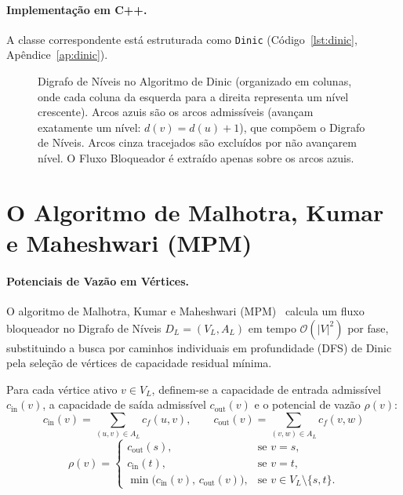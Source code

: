 \paragraph{Implementação em C++.}
A classe correspondente está estruturada como \lstinline{Dinic} (Código~\ref{lst:dinic}, Apêndice~\ref{ap:dinic}).

\begin{figure}[!ht]
\centering

\caption{Digrafo de Níveis no Algoritmo de Dinic (organizado em colunas, onde cada coluna da esquerda para a direita representa um nível crescente). Arcos azuis são os arcos admissíveis (avançam exatamente um nível: $d(v) = d(u)+1$), que compõem o Digrafo de Níveis. Arcos cinza tracejados são excluídos por não avançarem nível. O Fluxo Bloqueador é extraído apenas sobre os arcos azuis.}
\label{fig:grafo_niveis}
\end{figure}


\section{O Algoritmo de Malhotra, Kumar e Maheshwari (MPM)}\label{sec:mpm}

\paragraph{Potenciais de Vazão em Vértices.}
O algoritmo de Malhotra, Kumar e Maheshwari (MPM)~\cite{malhotra1978algorithm} calcula um fluxo bloqueador no Digrafo de Níveis $D_L = (V_L, A_L)$ em tempo $\mathcal{O}(|V|^2)$ por fase, substituindo a busca por caminhos individuais em profundidade (DFS) de Dinic pela seleção de vértices de capacidade residual mínima.

Para cada vértice ativo $v \in V_L$, definem-se a capacidade de entrada admissível $c_{\text{in}}(v)$, a capacidade de saída admissível $c_{\text{out}}(v)$ e o potencial de vazão $\rho(v)$:
\begin{equation}
    c_{\text{in}}(v) = \sum_{(u,v) \in A_L} c_f(u,v), \qquad
    c_{\text{out}}(v) = \sum_{(v,w) \in A_L} c_f(v,w)
\end{equation}
\begin{equation}
    \rho(v) = \begin{cases}
        c_{\text{out}}(s), & \text{se } v = s, \\
        c_{\text{in}}(t), & \text{se } v = t, \\
        \min\bigl(c_{\text{in}}(v),\, c_{\text{out}}(v)\bigr), & \text{se } v \in V_L \setminus \{s, t\}.
    \end{cases}
\end{equation}

